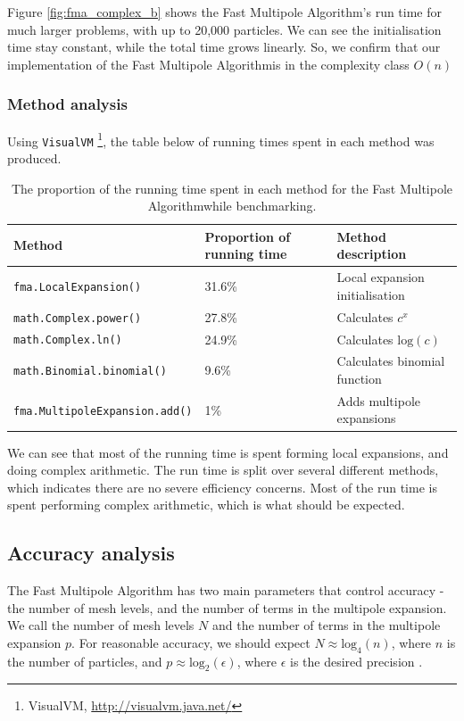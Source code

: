 \documentclass[pdftex,twoside,a4paper]{report}
\newcommand{\fma}{Fast Multipole Algorithm}
\begin{document}
Figure \ref{fig:fma_complex_b} shows the \fma's run time for much larger problems, with up to 20,000 particles. We can see the initialisation time stay constant, while the total time grows linearly. So, we confirm that our implementation of the \fma is in the complexity class $O(n)$ \newline
\subsubsection{Method analysis}
Using \texttt{VisualVM} \footnote{VisualVM, \url{http://visualvm.java.net/}}, the table below of running times spent in each method was produced.

\begin{table}
    \begin{tabular}{|l|l|l|}
        Method                       & Proportion of running time & Method description \\ \hline
        \texttt{fma.LocalExpansion()}         & 31.6\%                      & Local expansion initialisation        \\ 
        \texttt{math.Complex.power()}         & 27.8\%                      & Calculates $c^x$             \\ 
        \texttt{math.Complex.ln()}            & 24.9\%                      & Calculates $\text{log}(c)$ \\
        \texttt{math.Binomial.binomial()}     & 9.6\%                       & Calculates binomial function \\ 
        \texttt{fma.MultipoleExpansion.add()} & 1\%                         & Adds multipole expansions
    \end{tabular}
    \label{tab:time_breakdown}
    \caption{The proportion of the running time spent in each method for the \fma while benchmarking.}
\end{table}

We can see that most of the running time is spent forming local expansions, and doing complex arithmetic. The run time is split over several different methods, which indicates there are no severe efficiency concerns. Most of the run time is spent performing complex arithmetic, which is what should be expected.

\subsection{Accuracy analysis}
The \fma{} has two main parameters that control accuracy - the number of mesh levels, and the number of terms in the multipole expansion. We call the number of mesh levels $N$ and the number of terms in the multipole expansion $p$. For reasonable accuracy, we should expect $N \approx \text{log}_4(n)$, where $n$ is the number of particles, and $p \approx \text{log}_2(\epsilon)$, where $\epsilon$ is the desired precision \cite{greengard:315}.
\end{document}
